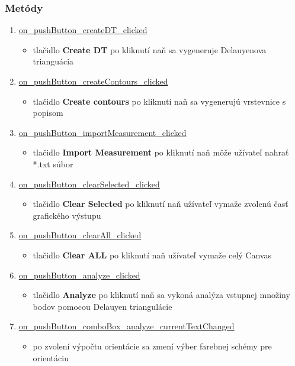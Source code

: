 \documentclass[12pt]{article}
\begin{document}
\subsubsection{Metódy}
\begin{enumerate}
\item[] \underline{on\_pushButton\_createDT\_clicked}
\begin{itemize}
\item tlačidlo \textbf{Create DT} po kliknutí naň sa vygeneruje Delauyenova trianguácia
\end{itemize}

\item[] \underline{on\_pushButton\_createContours\_clicked}
\begin{itemize}
\item tlačidlo \textbf{Create contours} po kliknutí naň sa vygenerujú vrstevnice s popisom
\end{itemize}

\item[] \underline{on\_pushButton\_importMeasurement\_clicked}
\begin{itemize}
\item tlačidlo \textbf{Import Measurement} po kliknutí naň môže užívateľ nahrať *.txt súbor 
\end{itemize}

\item[] \underline{on\_pushButton\_clearSelected\_clicked}
\begin{itemize}
\item tlačidlo \textbf{Clear Selected} po kliknutí naň užívateľ vymaže zvolenú časť grafického výstupu
\end{itemize}

\item[] \underline{on\_pushButton\_clearAll\_clicked}
\begin{itemize}
\item tlačidlo \textbf{Clear ALL} po kliknutí naň užívateľ vymaže celý Canvas
\end{itemize}

\item[] \underline{on\_pushButton\_analyze\_clicked}
\begin{itemize}
\item tlačidlo \textbf{Analyze} po kliknutí naň sa vykoná analýza vstupnej množiny bodov pomocou Delauyen triangulácie
\end{itemize}

\item[] \underline{on\_pushButton\_comboBox\_analyze\_currentTextChanged}
\begin{itemize}
\item po zvolení výpočtu orientácie sa zmení výber farebnej schémy pre orientáciu
\end{itemize}


\end{enumerate}
\end{document}
